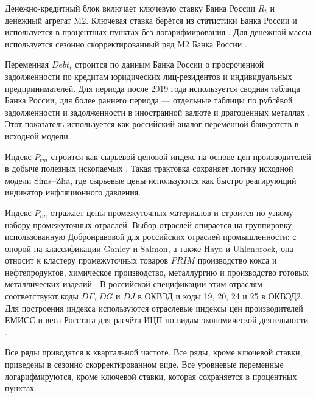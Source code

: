 Денежно-кредитный блок включает ключевую ставку Банка России $R_t$ и денежный агрегат M2. Ключевая ставка берётся из статистики Банка России и используется в процентных пунктах без логарифмирования \cite{cbr_key_rate}. Для денежной массы используется сезонно скорректированный ряд M2 Банка России \cite{cbr_m2_sa}.

Переменная $Debt_t$ строится по данным Банка России о просроченной задолженности по кредитам юридических лиц-резидентов и индивидуальных предпринимателей. Для периода после 2019 года используется сводная таблица Банка России, для более раннего периода --- отдельные таблицы по рублёвой задолженности и задолженности в иностранной валюте и драгоценных металлах \cite{cbr_overdue_debt_after_2019,cbr_overdue_debt_rub_before_2019,cbr_overdue_debt_fx_before_2019}. Этот показатель используется как российский аналог переменной банкротств в исходной модели.

Индекс $P_{cm}$ строится как сырьевой ценовой индекс на основе цен производителей в добыче полезных ископаемых \cite{fedstat_ppi_43561,fedstat_ppi_57609}. Такая трактовка сохраняет логику исходной модели Sims--Zha, где сырьевые цены используются как быстро реагирующий индикатор инфляционного давления.

Индекс $P_{im}$ отражает цены промежуточных материалов и строится по узкому набору промежуточных отраслей. Выбор отраслей опирается на группировку, использованную Добронравовой для российских отраслей промышленности: с опорой на классификации Ganley и Salmon, а также Hayo и Uhlenbrock, она относит к кластеру промежуточных товаров $PRIM$ производство кокса и нефтепродуктов, химическое производство, металлургию и производство готовых металлических изделий \cite{dobronravova2022industry}. В российской спецификации этим отраслям соответствуют коды $DF$, $DG$ и $DJ$ в ОКВЭД и коды 19, 20, 24 и 25 в ОКВЭД2. Для построения индекса используются отраслевые индексы цен производителей ЕМИСС и веса Росстата для расчёта ИЦП по видам экономической деятельности \cite{fedstat_ppi_43561,fedstat_ppi_57609,rosstat_ppi_weights}.

Все ряды приводятся к квартальной частоте. Все ряды, кроме ключевой ставки, приведены в сезонно скорректированном виде. Все уровневые переменные логарифмируются, кроме ключевой ставки, которая сохраняется в процентных пунктах.
